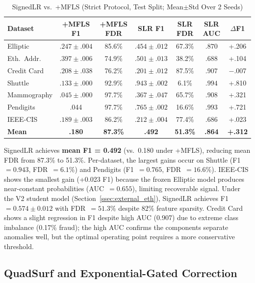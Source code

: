 \documentclass[journal]{IEEEtran}
\begin{document}
\begin{table}[!t]
\centering
\caption{SignedLR vs.\ +MFLS (Strict Protocol, Test Split; Mean$\pm$Std Over 2 Seeds)}
\label{tab:slr}
\setlength{\tabcolsep}{3pt}
\begin{tabular}{@{}lcccccc@{}}
\toprule
\textbf{Dataset} & \textbf{+MFLS F1} & \textbf{+MFLS FDR} & \textbf{SLR F1} & \textbf{SLR FDR} & \textbf{SLR AUC} & $\Delta$\textbf{F1} \\
\midrule
Elliptic     & $.247\pm.004$ & 85.6\% & $.454\pm.012$ & 67.3\% & $.870$ & +.206 \\
Eth.\ Addr.  & $.397\pm.006$ & 74.9\% & $.501\pm.013$ & 38.2\% & $.688$ & +.104 \\
Credit Card  & $.208\pm.038$ & 76.2\% & $.201\pm.012$ & 87.5\% & $.907$ & $-$.007 \\
Shuttle      & $.133\pm.000$ & 92.9\% & $.943\pm.002$ & 6.1\%  & $.994$ & +.810 \\
Mammography  & $.045\pm.000$ & 97.7\% & $.367\pm.047$ & 65.7\% & $.908$ & +.321 \\
Pendigits    & .044          & 97.7\% & $.765\pm.002$ & 16.6\% & $.993$ & +.721 \\
IEEE-CIS     & $.189\pm.003$ & 86.2\% & $.212\pm.004$ & 77.4\% & $.686$ & +.023 \\
\midrule
\textbf{Mean} & \textbf{.180} & \textbf{87.3\%} & \textbf{.492} & \textbf{51.3\%} & \textbf{.864} & \textbf{+.312} \\
\bottomrule
\end{tabular}
\end{table}

SignedLR achieves \textbf{mean F1 = 0.492} (vs.\ 0.180 under +MFLS), reducing mean FDR from 87.3\% to 51.3\%. Per-dataset, the largest gains occur on Shuttle (F1~$= 0.943$, FDR~$= 6.1\%$) and Pendigits (F1~$= 0.765$, FDR~$= 16.6\%$). IEEE-CIS shows the smallest gain (+0.023 F1) because the frozen Elliptic model produces near-constant probabilities (AUC~$= 0.655$), limiting recoverable signal. Under the V2 student model (Section~\ref{ssec:external_eth}), SignedLR achieves F1~$= 0.574{\pm}0.012$ with FDR~$= 51.3\%$ despite 82\% feature sparsity. Credit Card shows a slight regression in F1 despite high AUC (0.907) due to extreme class imbalance (0.17\% fraud); the high AUC confirms the components separate anomalies well, but the optimal operating point requires a more conservative threshold.

\subsection{QuadSurf and Exponential-Gated Correction}
\label{ssec:quadsurf}
\end{document}
